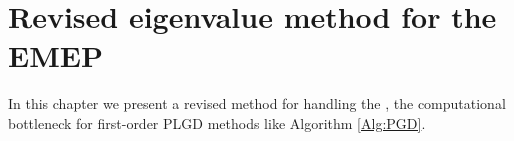 \chapter{Revised eigenvalue method for the EMEP}			\label{Sec:Revised_method}

In this chapter we present a revised method for handling the \emep, the computational bottleneck for first-order PLGD methods like Algorithm \ref{Alg:PGD}.